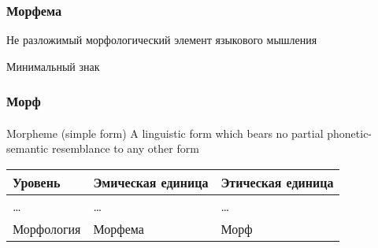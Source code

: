 \begin{frame}
    \frametitle{Морфема}

    \begin{exampleblock}{\autocite[290--291]{baudouin:1963}}
        Не разложимый морфологический элемент языкового мышления
    \end{exampleblock}

    \begin{exampleblock}{\autocite{les}}
        Минимальный знак
    \end{exampleblock}

\end{frame}

\begin{frame}
    \frametitle{Морф}
    \framesubtitle{\autocites[161]{bloomfield:1973}{haspelmath:2020}}

    \begin{block}{Morpheme (simple form)}
        A linguistic form which bears no partial phonetic-semantic resemblance to any other form
    \end{block}

    \begin{table}
        \begin{tabularx}{\textwidth}{XXX}
            Уровень & Эмическая единица & Этическая единица \\ \midrule \midrule
            \ldots & \ldots & \ldots \\ \midrule
            Морфология & Морфема & Морф \\
        \end{tabularx}
    \end{table}

    \begin{columns}
        \begin{center}
             
        \end{center}

   \end{columns}
\end{frame}

